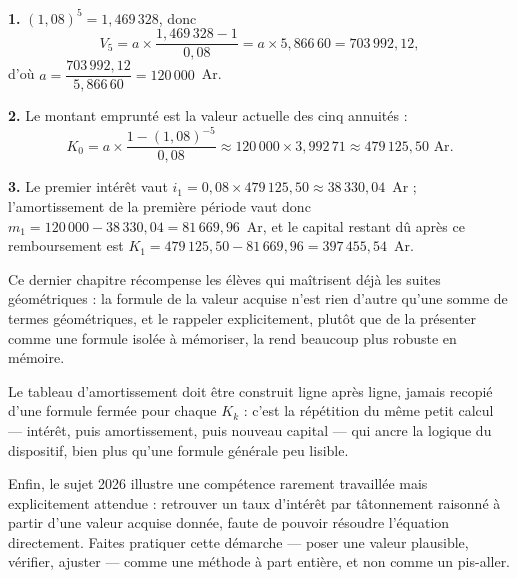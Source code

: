 \begin{corrige}
\textbf{1.} $(1{,}08)^{5} = 1{,}469\,328$, donc
\[
  V_{5} = a \times \frac{1{,}469\,328-1}{0{,}08}
  = a \times 5{,}866\,60 = 703\,992{,}12,
\]
d'où $a = \dfrac{703\,992{,}12}{5{,}866\,60} = 120\,000$~Ar.

\textbf{2.} Le montant emprunté est la valeur actuelle des cinq annuités :
\[
  K_{0} = a \times \frac{1-(1{,}08)^{-5}}{0{,}08}
  \approx 120\,000 \times 3{,}992\,71 \approx 479\,125{,}50 \text{ Ar}.
\]

\textbf{3.} Le premier intérêt vaut $i_{1} = 0{,}08 \times 479\,125{,}50
\approx 38\,330{,}04$~Ar ; l'amortissement de la première période vaut donc
$m_{1} = 120\,000-38\,330{,}04 = 81\,669{,}96$~Ar, et le capital restant dû
après ce remboursement est
$K_{1} = 479\,125{,}50-81\,669{,}96 = 397\,455{,}54$~Ar.
\end{corrige}

\begin{notepourlaclasse}
Ce dernier chapitre récompense les élèves qui maîtrisent déjà les suites
géométriques : la formule de la valeur acquise n'est rien d'autre qu'une
somme de termes géométriques, et le rappeler explicitement, plutôt que de la
présenter comme une formule isolée à mémoriser, la rend beaucoup plus
robuste en mémoire.

Le tableau d'amortissement doit être construit ligne après ligne, jamais
recopié d'une formule fermée pour chaque $K_{k}$ : c'est la répétition du
même petit calcul — intérêt, puis amortissement, puis nouveau capital — qui
ancre la logique du dispositif, bien plus qu'une formule générale peu
lisible.

Enfin, le sujet 2026 illustre une compétence rarement travaillée mais
explicitement attendue : retrouver un taux d'intérêt par tâtonnement
raisonné à partir d'une valeur acquise donnée, faute de pouvoir résoudre
l'équation directement. Faites pratiquer cette démarche — poser une valeur
plausible, vérifier, ajuster — comme une méthode à part entière, et non
comme un pis-aller.
\end{notepourlaclasse}

